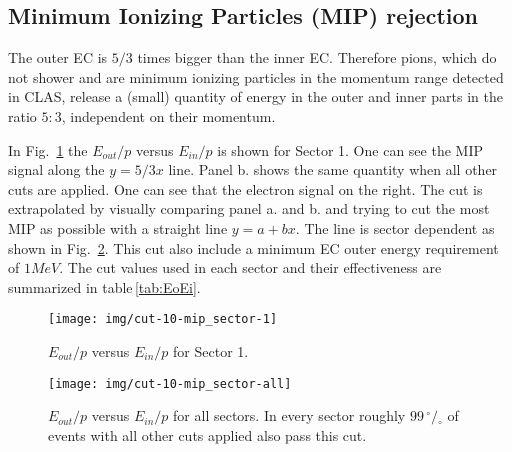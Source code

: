\clearpage\newpage

\subsection{Minimum Ionizing Particles (MIP) rejection}
The outer EC is $5/3$ times bigger than the inner EC. Therefore pions,
which do not shower and are minimum ionizing particles in the momentum range
detected in CLAS, release a (small) quantity of energy in the outer and inner
parts in the ratio $5:3$, independent on their momentum.

In Fig.~\ref{fig:EoEi} the $E_{out}/p$ versus $E_{in}/p$ is shown for Sector 1.
One can see the MIP signal along the $y=5/3x $ line.
Panel b. shows the same quantity when all other cuts are applied.
One can see that the electron signal on the right.
The cut is extrapolated by visually comparing panel a. and b. and trying to
cut the most MIP as possible with a straight line $y = a + bx$. The line
is sector dependent as shown in Fig.~\ref{fig:EoEi_all}.
This cut also include a minimum EC outer energy requirement of $1MeV$.
The cut values used in each sector and their effectiveness are summarized in
table\,\ref{tab:EoEi}.


\begin{figure}[ht]
    \centering
    \texttt{[image: img/cut-10-mip\_sector-1]}
    \caption{$E_{out}/p$ versus $E_{in}/p$ for Sector 1.}
    \label{fig:EoEi}
\end{figure}


\clearpage\newpage
\begin{figure}[ht]
    \centering
    \texttt{[image: img/cut-10-mip\_sector-all]}
    \caption{$E_{out}/p$ versus $E_{in}/p$ for all sectors. In every sector
    roughly $99\,^{\circ\!\!}/\!_\circ$ of events with all other cuts applied also pass this cut. }
    \label{fig:EoEi_all}
\end{figure}

\clearpage\newpage

